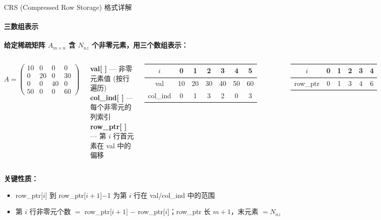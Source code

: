 \documentclass[12pt,aspectratio=169]{beamer}
\begin{document}
\begin{frame}[shrink]{CRS (Compressed Row Storage) 格式详解}
\framesubtitle{三数组表示}

\textbf{给定稀疏矩阵 $A_{m \times n}$ 含 $N_{\!nz}$ 个非零元素，用三个数组表示：}

\begin{columns}[T]
\[
A = \begin{pmatrix}
10 & 0  & 0  & 0  \\
0  & 20 & 0  & 30 \\
0  & 0  & 40 & 0  \\
50 & 0  & 0  & 60
\end{pmatrix}
\]

\small
\textbf{val[ ]} — 非零元素值 (按行遍历)\\
\textbf{col\_ind[ ]} — 每个非零元的列索引\\
\textbf{row\_ptr[ ]} — 第 $i$ 行首元素在 val 中的偏移

\vspace{2pt}
\renewcommand{\arraystretch}{1.1}
\begin{tabular}{c|cccccc}
$i$ & 0 & 1 & 2 & 3 & 4 & 5 \\ \hline
val & 10 & 20 & 30 & 40 & 50 & 60 \\
col\_ind & 0 & 1 & 3 & 2 & 0 & 3 \\
\end{tabular}

\vspace{2pt}
\begin{tabular}{c|ccccc}
$i$ & 0 & 1 & 2 & 3 & 4 \\ \hline
row\_ptr & 0 & 1 & 3 & 4 & 6 \\
\end{tabular}
\end{columns}

\vspace{6pt}
\textbf{关键性质：}
\begin{itemize}
  \item row\_ptr[$i$] 到 row\_ptr[$i+1$]$-$1 为第 $i$ 行在 val/col\_ind 中的范围
  \item 第 $i$ 行非零元个数 $=$ row\_ptr[$i+1$] $-$ row\_ptr[$i$]；row\_ptr 长 $m+1$，末元素 $=N_{\!nz}$
\end{itemize}
\end{frame}
\end{document}
